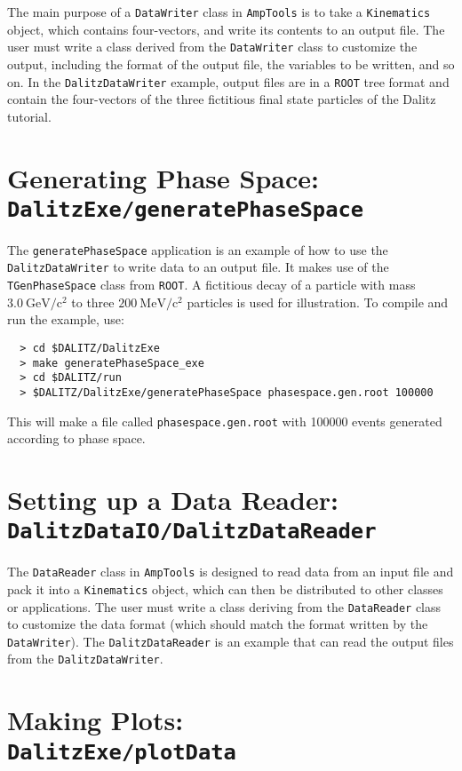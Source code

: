 \documentclass[11pt]{article}
\newcommand{\gevcc}{\mathrm{GeV/c^2}}
\newcommand{\mevcc}{\mathrm{MeV/c^2}}
\begin{document}
The main purpose of a {\tt DataWriter} class in {\tt AmpTools} is to take a {\tt Kinematics} object, which contains four-vectors, and write its contents to an output file.  The user must write a class derived from the {\tt DataWriter} class to customize the output, including the format of the output file, the variables to be written, and so on.  In the {\tt DalitzDataWriter} example, output files are in a {\tt ROOT} tree format and contain the four-vectors of the three fictitious final state particles of the Dalitz tutorial.

\section{Generating Phase Space: \\  
{\tt DalitzExe/generatePhaseSpace}}
\label{sec:ps}

The {\tt generatePhaseSpace} application is an example of how to use the {\tt DalitzDataWriter} to write data to an output file.  It makes use of the {\tt TGenPhaseSpace} class from {\tt ROOT}.  A fictitious decay of a particle with mass $3.0~\gevcc$ to three $200~\mevcc$ particles is used for illustration.  To compile and run the example, use:
\begin{verbatim}
  > cd $DALITZ/DalitzExe
  > make generatePhaseSpace_exe
  > cd $DALITZ/run
  > $DALITZ/DalitzExe/generatePhaseSpace phasespace.gen.root 100000
\end{verbatim}
This will make a file called {\tt phasespace.gen.root} with 100000 events generated according to phase space.

\section{Setting up a Data Reader: \\
{\tt DalitzDataIO/DalitzDataReader}}
\label{sec:dr}

The {\tt DataReader} class in {\tt AmpTools} is designed to read data from an input file and pack it into a {\tt Kinematics} object, which can then be distributed to other classes or applications.  The user must write a class deriving from the {\tt DataReader} class to customize the data format (which should match the format written by the {\tt DataWriter}).  The {\tt DalitzDataReader} is an example that can read the output files from the {\tt DalitzDataWriter}.

\section{Making Plots: \\
{\tt DalitzExe/plotData}}
\label{sec:plot}
\end{document}
